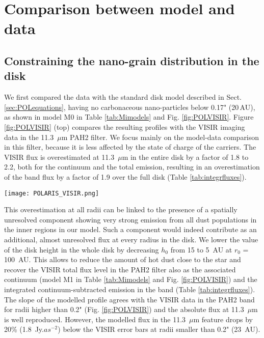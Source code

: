 \documentclass{aa}
\newcommand{\mic}{~$\mu$m\xspace}
\begin{document}
\section{Comparison between model and data} \label{sec:results}
\subsection{Constraining the nano-grain distribution in the disk} \label{sec:resultsdistribution}
We first compared the data with the standard disk model described in Sect. \ref{sec:POLequations}, having no carbonaceous nano-particles below 0.17" (20\,AU), as shown in model M0 in Table \ref{tab:Mimodels} and Fig. \ref{fig:POLVISIR}. Figure  \ref{fig:POLVISIR} (top) compares the resulting profiles with the VISIR imaging data in the 11.3\mic PAH2 filter. We focus mainly on the model-data comparison in this filter, because it is less affected by the state of charge of the carriers. The VISIR flux is overestimated at 11.3\mic in the entire disk by a factor of 1.8 to 2.2, both for the continuum and the total emission, resulting in an overestimation of the band flux by a factor of 1.9 over the full disk (Table \ref{tab:integrfluxes}).


\begin{figure*}[!ht]
    \centering
\texttt{[image: POLARIS\_VISIR.png]}
    \caption{VISIR radial profiles (black full line), compared to simulated results (dotted, dashed, dash-dash-dotted, and dash-dot-dotted lines) for the PAH2 filter and associated continuum on the top panels, and the PAH1 filter and continuum on the bottom panels. For a description of the different models, we refer to Table \ref{tab:Mimodels}. The grey fill indicates the location of micron- and millimeter-sized grain dust.}
    \label{fig:POLVISIR}
\end{figure*}

This overestimation at all radii can be linked to the presence of a spatially unresolved component showing very strong emission from all dust populations in the inner regions in our model. Such a component would indeed contribute as an additional, almost unresolved flux at every radius in the disk.
We lower the value of the disk height in the whole disk by decreasing $h_0$ from 15 to 5~AU at $r_0$ = 100~AU. This allows to reduce the amount of hot dust close to the star and recover the VISIR total flux level in the PAH2 filter also as the associated continuum (model M1 in Table \ref{tab:Mimodels} and Fig. \ref{fig:POLVISIR}) and the integrated continuum-subtracted emission in the band (Table \ref{tab:integrfluxes}). 
The slope of the modelled profile agrees with the VISIR data in the PAH2 band for radii higher than 0.2" (Fig. \ref{fig:POLVISIR}) and the absolute flux at 11.3\mic is well reproduced. However, the modelled flux in the 11.3\mic feature drops by 20\% (1.8~Jy.$as^{-2}$) below the VISIR error bars at radii smaller than 0.2" (23~AU). 
\end{document}

